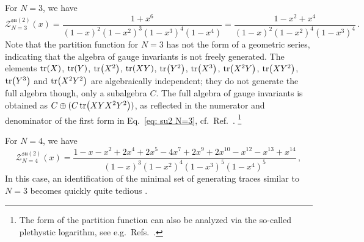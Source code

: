 \documentclass[a4paper,11pt]{article}
\begin{document}
For $N=3$, we have \cite{teranishi1986}
\begin{equation}
\label{eq: su2 N=3}
	\mathcal{Z}^{\mathfrak{su}(2)}_{N=3}(x) = \frac{1+x^6}{(1-x)^2(1-x^2)^3(1-x^3)^4(1-x^4)}= \frac{1-x^2+x^4}{(1-x)^2(1-x^2)^4(1-x^3)^4} \,.
\end{equation}
Note that the partition function for $N=3$ has not the form of a geometric series, indicating that the algebra of gauge invariants is not freely generated. 
The elements $\tr(X)$, $\tr(Y)$, $\tr(X^2)$, $\tr(XY)$, $\tr(Y^2)$, $\tr(X^3)$, $\tr(X^2Y)$, $\tr(XY^2)$, $\tr(Y^3)$ and $\tr(X^2Y^2)$ are algebraically independent; they do not generate the full algebra though, only a subalgebra $C$. The full algebra of gauge invariants is obtained as $C\oplus (C \tr(XYX^2Y^2))$, as reflected in the numerator and denominator of the first form in Eq.\ \eqref{eq: su2 N=3}, cf.\ Ref.\ \cite{teranishi1986}.%
\footnote{The form of the partition function can also be analyzed via the so-called plethystic logarithm, see e.g.\ Refs.\ \cite{Benvenuti:2006qr,Feng:2007ur,Kimura:2009ur,Harmark:2014mpa}.
}

For $N=4$, we have \cite{teranishi1987}
\begin{equation}
	\mathcal{Z}^{\mathfrak{su}(2)}_{N=4}(x) = \frac{1-x-x^2+2x^4+2x^5-4x^7+2x^9+2x^{10}-x^{12}-x^{13}+x^{14}}{(1-x)^3(1-x^2)^4(1-x^3)^5(1-x^4)^5} \,,
\end{equation}
In this case, an identification of the minimal set of generating traces similar to $N=3$ becomes quickly quite tedious \cite{teranishi1987}.
\end{document}
